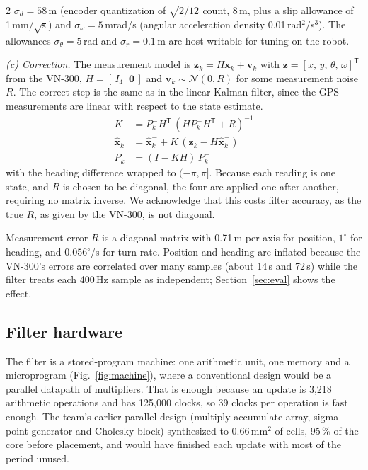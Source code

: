 \documentclass[10pt,letterpaper]{article}
\begin{document}
\begin{multicols}{2}
  $\sigma_d=58$\,\textmu m (encoder quantization of $\sqrt{2/12}$ count, 8\,\textmu m, plus a slip allowance of 1\,mm$/\sqrt{\text{s}}$) and $\sigma_\omega=5$\,mrad/s (angular acceleration density 0.01\,rad$^2$/s$^3$).
  The allowances $\sigma_\theta=5$\,\textmu rad and $\sigma_r=0.1$\,\textmu m are host-writable for tuning on the robot.

  \textit{(c) Correction.}
  The measurement model is $\mathbf{z}_k=H\mathbf{x}_k+\mathbf{v}_k$ with $\mathbf{z}=[x,\,y,\,\theta,\,\omega]^{\mathsf T}$ from the VN-300, $H=[\,I_4\;\;\mathbf{0}\,]$ and $\mathbf{v}_k\sim\mathcal{N}(0,R)$ for some measurement noise $R$.
  The correct step is the same as in the linear Kalman filter, since the GPS measurements are linear with respect to the state estimate.
  \begin{align*}
    K &= P_k^-H^{\mathsf T}\,(HP_k^-H^{\mathsf T}+R)^{-1}\\
    \hat{\mathbf x}_k &= \hat{\mathbf x}_k^-+K\,(\mathbf{z}_k-H\hat{\mathbf x}_k^-)\\
    P_k &= (I-KH)\,P_k^-
  \end{align*}
  with the heading difference wrapped to $(-\pi,\pi]$.
  Because each reading is one state, and $R$ is chosen to be diagonal, the four are applied one after another, requiring no matrix inverse. We acknowledge that this costs filter accuracy, as the true $R$, as given by the VN-300, is not diagonal.

  Measurement error $R$ is a diagonal matrix with 0.71\,m per axis for position, $1^\circ$ for heading, and $0.056^\circ$/s for turn rate.
  Position and heading are inflated because the VN-300's errors are correlated over many samples (about 14\,s and 72\,s) while the filter treats each 400\,Hz sample as independent; Section~\ref{sec:eval} shows the effect.

  \subsection{Filter hardware}
  \label{sec:fhw}

  The filter is a stored-program machine: one arithmetic unit, one memory and a microprogram (Fig.~\ref{fig:machine}), where a conventional design would be a parallel datapath of multipliers.
  That is enough because an update is 3,218 arithmetic operations and has 125,000 clocks, so 39 clocks per operation is fast enough.
  The team's earlier parallel design (multiply-accumulate array, sigma-point generator and Cholesky block) synthesized to 0.66\,mm$^2$ of cells, 95\,\% of the core before placement, and would have finished each update with most of the period unused.


\end{multicols}
\end{document}
